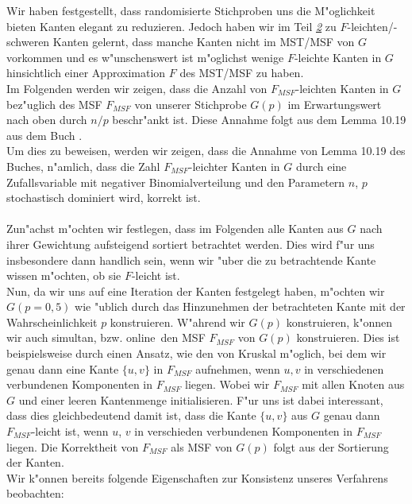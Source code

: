 Wir haben festgestellt, dass randomisierte Stichproben uns die M"oglichkeit 
    bieten Kanten elegant zu reduzieren.
    Jedoch haben wir im Teil \hyperref[sec:fEdg]{\textit{2}} zu $F$-leichten/-schweren Kanten gelernt, dass
    manche Kanten nicht im MST/MSF von $G$ vorkommen und es w"unschenswert
    ist m"oglichst wenige $F$-leichte Kanten in $G$ hinsichtlich einer 
    Approximation $F$ des MST/MSF zu haben.\\
Im Folgenden werden wir zeigen, dass die Anzahl von $F_{MSF}$-leichten Kanten in $G$ 
    bez"uglich des MSF $F_{MSF}$ von unserer Stichprobe $G(p)$ im Erwartungswert 
    nach oben durch $n/p$ beschr"ankt ist. 
    Diese Annahme folgt aus dem Lemma 10.19 aus dem Buch \cite{randAlg}.\\
Um dies zu beweisen, werden wir zeigen, dass die Annahme von Lemma 10.19 des
    Buches, n"amlich, dass die Zahl $F_{MSF}$-leichter Kanten in $G$ durch
    eine Zufallsvariable mit negativer Binomialverteilung und den Parametern
    $n$, $p$ stochastisch dominiert wird, korrekt ist.\\
\\
Zun"achst m"ochten wir festlegen, dass im Folgenden alle Kanten aus $G$ nach 
    ihrer Gewichtung aufsteigend sortiert betrachtet werden.
    Dies wird f"ur uns insbesondere dann handlich sein, wenn wir "uber die zu 
    betrachtende Kante wissen m"ochten, ob sie $F$-leicht ist.\\
Nun, da wir uns auf eine Iteration der Kanten festgelegt haben, m"ochten wir 
    $G(p=0,5)$ wie "ublich durch das Hinzunehmen der betrachteten Kante mit
    der Wahrscheinlichkeit $p$ konstruieren.
    W"ahrend wir $G(p)$ konstruieren, k"onnen wir auch simultan, bzw. 
    \glqq online\grqq\ den MSF $F_{MSF}$ von $G(p)$ konstruieren.
    Dies ist beispielsweise durch einen Ansatz, wie den von Kruskal m"oglich, bei
    dem wir genau dann eine Kante $\{u,v\}$ in $F_{MSF}$ aufnehmen, wenn $u,v$
    in verschiedenen verbundenen Komponenten in $F_{MSF}$ liegen. 
    Wobei wir 
    $F_{MSF}$ mit allen Knoten aus $G$ und einer leeren Kantenmenge 
    initialisieren.
    F"ur uns ist dabei interessant, dass dies gleichbedeutend damit ist, dass die Kante 
    $\{u,v\}$
    aus $G$ genau dann $F_{MSF}$-leicht ist, wenn $u$, $v$ in verschieden 
    verbundenen Komponenten in $F_{MSF}$ liegen.
    Die Korrektheit von $F_{MSF}$ als MSF von $G(p)$ folgt aus der Sortierung der Kanten.\\
Wir k"onnen bereits folgende Eigenschaften zur Konsistenz unseres Verfahrens
    beobachten:\\ 

